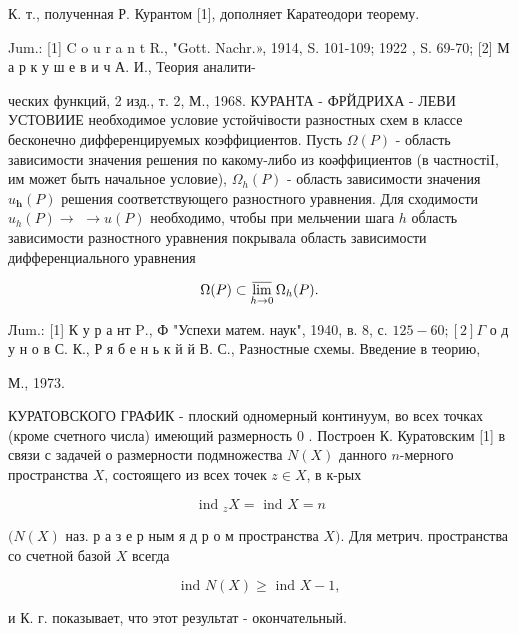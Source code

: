 \documentclass[10pt]{article}
\begin{document}
К. т., полученная Р. Курантом [1], дополняет Каратеодори теорему.



Jum.: [1] C o u r a n t R., "Gott. Nachr.», 1914, S. 101-109; 1922 , S. 69-70; [2] М а р к у ш е в и ч А. И., Теория аналити-

ческих функций, 2 изд., т. 2, М., 1968. КУРАНТА - ФРЙДРИХА - ЛЕВИ УСТОВИИЕ необходимое условие устойчівости разностных схем в классе бесконечно дифференцируемых коэффициентов. Пусть $\Omega(P)$ - область зависимости значения решения по какому-либо из коәффициентов (в частностіI, им может быть начальное условие), $\Omega_{h}(P)$ - область зависимости значения $u_{\boldsymbol{h}}(P)$ решения соответствующего разностного уравнения. Для сходимости $u_{h}(P) \rightarrow$ $\rightarrow u(P)$ необходимо, чтобы при мельчении шага $h$ об́ласть зависимости разностного уравнения покрывала область зависимости дифференциального уравнения



\[

\Omega(P) \subset \varlimsup_{h \rightarrow 0} \Omega_{h}(P) .

\]



Лum.: [1] К у р а нт $\mathrm{P} .$, Ф "Успехи матем. наук", 1940, в. 8, с. $125-60 ;[2] \Gamma$ о д у н о в С. К., Р я б е н ь к й й В. С., Разностные схемы. Введение в теорию,

М., 1973.



КУРАТОВСКОГО ГРАФИК - плоский одномерный континуум, во всех точках (кроме счетного числа) имеющий размерность 0 . Построен К. Куратовским [1] в связи с задачей о размерности подмножества $N(X)$ данного $n$-мерного пространства $X$, состоящего из всех точек $z \in X$, в к-рых



\[

\text { ind }_{z} X=\text { ind } X=n

\]



$(N(X)$ наз. р а з е р ным я д р о м пространства $X)$. Для метрич. пространства со счетной базой $X$ всегда



\[

\text { ind } N(X) \geqslant \text { ind } X-1 \text {, }

\]



и К. г. показывает, что этот результат - окончательный.
\end{document}
